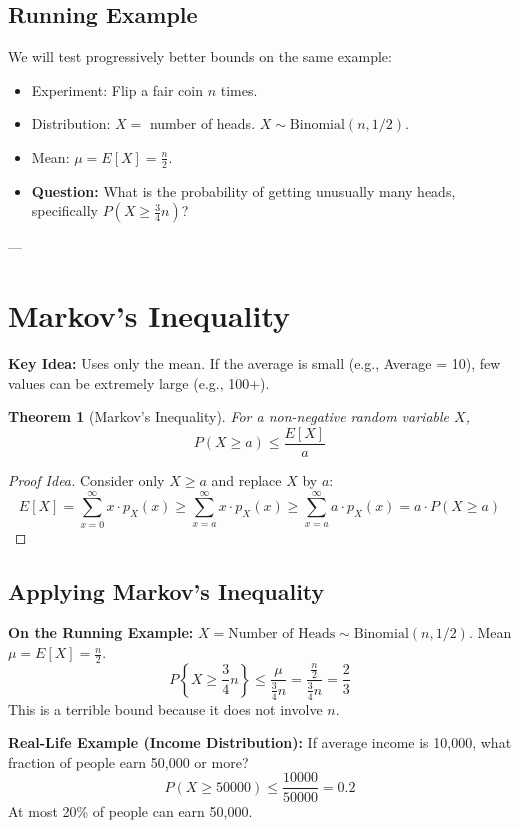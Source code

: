 \documentclass[11pt]{article}
\newtheorem{theorem}{Theorem}
\begin{document}
\subsection{Running Example}
We will test progressively better bounds on the same example:
\begin{itemize}
    \item Experiment: Flip a fair coin $n$ times.
    \item Distribution: $X =$ number of heads. $X \sim \text{Binomial}(n, 1/2)$.
    \item Mean: $\mu = E[X] = \frac{n}{2}$.
    \item \textbf{Question:} What is the probability of getting unusually many heads, specifically $P(X \ge \frac{3}{4}n)$?
\end{itemize}

---

\section{Markov's Inequality}

\textbf{Key Idea:} Uses only the mean. If the average is small (e.g., Average = 10), few values can be extremely large (e.g., 100+).

\begin{theorem}[Markov's Inequality]
For a non-negative random variable $X$, 
\[ P(X \ge a) \le \frac{E[X]}{a} \]
\end{theorem}

\begin{proof}[Proof Idea]
Consider only $X \ge a$ and replace $X$ by $a$:
\[ E[X] = \sum_{x=0}^{\infty} x \cdot p_X(x) \ge \sum_{x=a}^{\infty} x \cdot p_X(x) \ge \sum_{x=a}^{\infty} a \cdot p_X(x) = a \cdot P(X \ge a) \]
\end{proof}

\subsection{Applying Markov's Inequality}
\textbf{On the Running Example:} 
$X = \text{Number of Heads} \sim \text{Binomial}(n, 1/2)$. Mean $\mu = E[X] = \frac{n}{2}$.
\[ P\left\{X \ge \frac{3}{4}n\right\} \le \frac{\mu}{\frac{3}{4}n} = \frac{\frac{n}{2}}{\frac{3}{4}n} = \frac{2}{3} \]
This is a terrible bound because it does not involve $n$.

\textbf{Real-Life Example (Income Distribution):} 
If average income is 10,000, what fraction of people earn 50,000 or more?
\[ P(X \ge 50000) \le \frac{10000}{50000} = 0.2 \]
At most 20\% of people can earn 50,000.
\end{document}
